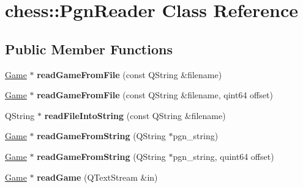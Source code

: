 \hypertarget{classchess_1_1PgnReader}{\section{chess\-:\-:Pgn\-Reader Class Reference}
\label{classchess_1_1PgnReader}
}
\subsection*{Public Member Functions}
\begin{DoxyCompactItemize}
\item 
\hypertarget{classchess_1_1PgnReader_a2ef648d6c122054f2495a48048de34fa}{\hyperlink{classchess_1_1Game}{Game} $\ast$ {\bfseries read\-Game\-From\-File} (const Q\-String \&filename)}\label{classchess_1_1PgnReader_a2ef648d6c122054f2495a48048de34fa}

\item 
\hypertarget{classchess_1_1PgnReader_a61b0f0f768fda08f1e55679ae0752b44}{\hyperlink{classchess_1_1Game}{Game} $\ast$ {\bfseries read\-Game\-From\-File} (const Q\-String \&filename, qint64 offset)}\label{classchess_1_1PgnReader_a61b0f0f768fda08f1e55679ae0752b44}

\item 
\hypertarget{classchess_1_1PgnReader_aaabd3a75f603921f6863c0c3da64901e}{Q\-String $\ast$ {\bfseries read\-File\-Into\-String} (const Q\-String \&filename)}\label{classchess_1_1PgnReader_aaabd3a75f603921f6863c0c3da64901e}

\item 
\hypertarget{classchess_1_1PgnReader_a67c553532b952f50b01efd8717694420}{\hyperlink{classchess_1_1Game}{Game} $\ast$ {\bfseries read\-Game\-From\-String} (Q\-String $\ast$pgn\-\_\-string)}\label{classchess_1_1PgnReader_a67c553532b952f50b01efd8717694420}

\item 
\hypertarget{classchess_1_1PgnReader_af66c9d84f1d0c8fe6ff8961dcd70a94b}{\hyperlink{classchess_1_1Game}{Game} $\ast$ {\bfseries read\-Game\-From\-String} (Q\-String $\ast$pgn\-\_\-string, quint64 offset)}\label{classchess_1_1PgnReader_af66c9d84f1d0c8fe6ff8961dcd70a94b}

\item 
\hypertarget{classchess_1_1PgnReader_af3852fca57fac1a7cdb223990a9b0c07}{\hyperlink{classchess_1_1Game}{Game} $\ast$ {\bfseries read\-Game} (Q\-Text\-Stream \&in)}\label{classchess_1_1PgnReader_af3852fca57fac1a7cdb223990a9b0c07}


\end{DoxyCompactItemize}
